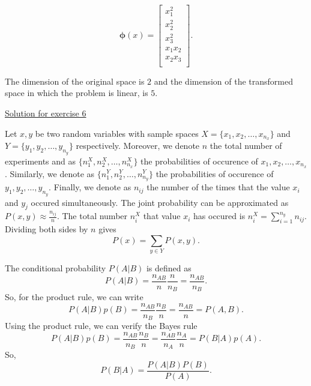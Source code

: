 \documentclass[12pt]{book}
\begin{document}
\begin{equation}
\bm{\phi}(x) = \begin{bmatrix}
x_{1}^2  \\
x_2^2 \\
x_3^2 \\
x_1x_2 \\
x_2x_3\\
\end{bmatrix}.
\end{equation}

\noindent
The dimension of the original space is $2$ and the dimension of the transformed space in which the problem is linear, is $5$.

\newpage

\vspace{0.5 cm}
\noindent
{\underline{\large Solution for exercise 6}}
\vspace{0.3 cm}

\noindent
Let $x, y$ be two random variables with sample spaces $X = \{x_1,x_2,\dots,x_{n_x}\}$ and $Y = \{y_1,y_2,\dots,y_{n_y}\}$ respectively. Moreover, we denote $n$ the total number of experiments and as $\{n_1^X,n_2^X,\dots,n_{n_x}^X\}$ the probabilities of occurence of $x_1,x_2,\dots,x_{n_x}$. Similarly, we denote as  $\{n_1^Y,n_2^Y,\dots,n_{n_y}^Y\}$ the probabilities of occurence of $y_1,y_2,\dots,y_{n_y}$. Finally, we denote as $n_{ij}$ the number of the times that the value $x_i$ and $y_j$ occured simultaneously. The joint probability can be approximated as $P(x,y) \approx \frac{n_{ij}}{n}$. The total number $n_i^X$ that value $x_i$ has occured is $n_i^X = \sum_{i=1}^{n_y}n_{ij}$. Dividing both sides by $n$ gives
\begin{equation}
P(x) = \sum_{y\in Y}P(x,y).
\end{equation}

\noindent
The conditional probability $P(A|B)$ is defined as
\begin{equation}
P(A|B) = \frac{n_{AB}}{n} \frac{n}{n_B} = \frac{n_{AB}}{n_B}.
\end{equation}
So, for the product rule, we can write
\begin{equation}
P(A|B)p(B) = \frac{n_{AB}}{n_B}\frac{n_B}{n} = \frac{n_{AB}}{n} = P(A,B).
\end{equation}
Using the product rule, we can verify the Bayes rule
\begin{equation}
P(A|B)p(B) = \frac{n_{AB}}{n_B}\frac{n_B}{n} = \frac{n_{AB}}{n_A}\frac{n_A}{n} = P(B|A)p(A).
\end{equation}
So,
\begin{equation}
P(B|A) = \frac{P(A|B)P(B)}{P(A)}.
\end{equation}
\end{document}
